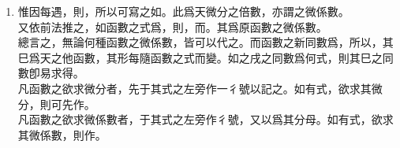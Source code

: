\begin{enumerate} [label={第\chinese*款}]
	如有式\CJKmove，則\CJKmove。此式之意謂戌之微分等于\CJKmove 乘天之微分。猶言函數戌之溢率等于以\CJKmove 乘其天之溢率也。如有式\CJKmove，則\CJKmove。此式之意謂戌之微分等于\CJKmove 乘天之微分。猶言函數戌之溢率等于以\CJKmove 乘其天之溢率也。
	\item 惟因每遇\CJKmove，則\CJKmove，所以可寫之如\CJKmove。此爲天微分之倍數，亦謂之微係數。\\
	又依前法推之，如函數之式爲\CJKmove，則\CJKmove，而\CJKmove。其\CJKmove 爲原函數\CJKmove 之微係數。\\
	總言之，無論何種函數之微係數，皆可以\CJKmove 代之。而函數之新同數爲\CJKmove，所以\CJKmove，其巳爲天之他函數，其形每隨函數之式而變。如之戌之同數爲何式，則其巳之同數卽易求得。\\
	凡函數之欲求微分者，先于其式之左旁作一彳號以記之。如有\CJKmove 式，欲求其微分，則可先作\CJKmove。\\
	凡函數之欲求微係數者，于其式之左旁作彳號，又以\CJKmove 爲其分母。如有\CJKmove 式，欲求其微係數，則作\CJKmove。\\

\end{enumerate}
